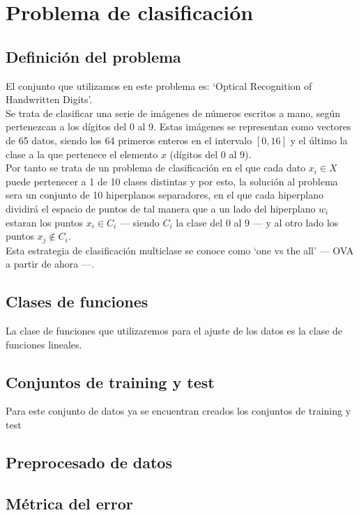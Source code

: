 \chapter{Problema de clasificación}
\section{Definición del problema}
El conjunto que utilizamos en este problema es: `Optical Recognition of Handwritten Digits'.\\
Se trata de clasificar una serie de imágenes de números escritos a mano, según pertenezcan a los dígitos del 0 al 9. Estas imágenes se representan como vectores de 65 datos, siendo los 64 primeros enteros en el intervalo $[0,16]$ y el último la clase a la que pertenece el elemento $x$ (dígitos del 0 al 9).\\
Por tanto se trata de un problema de clasificación en el que cada dato $x_i \in X$ puede pertenecer a 1 de 10 clases distintas y por esto, la solución al problema sera un conjunto de 10 hiperplanos separadores, en el que cada hiperplano dividirá el espacio de puntos de tal manera que a un lado del hiperplano $w_i$ estaran los puntos $x_i \in C_i$ --- siendo $C_i$ la clase del 0 al 9 --- y al otro lado los puntos $ x_j \notin C_i  $.\\
Esta estrategia de clasificación multiclase se conoce como `one vs the all' --- OVA a partir de ahora ---.

\section{Clases de funciones}
La clase de funciones que utilizaremos para el ajuste de los datos es la clase de funciones lineales.

\section{Conjuntos de training y test}
Para este conjunto de datos ya se encuentran creados los conjuntos de training y test\cite{latexcompanion}


\section{Preprocesado de datos}

\section{Métrica del error}

